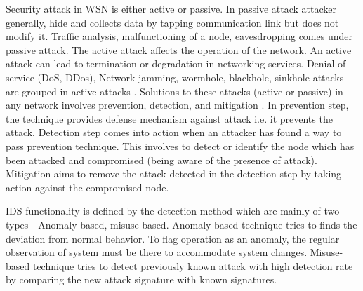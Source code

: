 Security attack in WSN is either active or passive. In passive attack attacker generally, hide and collects data by tapping communication link but does not modify it. Traffic analysis, malfunctioning of a node, eavesdropping comes under passive attack. The active attack affects the operation of the network. An active attack can lead to termination or degradation in networking services. Denial-of-service (DoS, DDos), Network jamming, wormhole, blackhole, sinkhole attacks are grouped in active attacks \cite{padmavathi2009survey}. Solutions to these attacks (active or passive) in any network involves prevention, detection, and mitigation \cite{fuchsberger2005intrusion}. In prevention step, the technique provides defense mechanism against attack i.e. it prevents the attack. Detection step comes into action when an attacker has found a way to pass prevention technique. This involves to detect or identify the node which has been attacked and compromised (being aware of the presence of attack). Mitigation aims to remove the attack detected in the detection step by taking action against the compromised node.
\par
IDS functionality is defined by the detection method which are mainly of two types - Anomaly-based, misuse-based. Anomaly-based technique tries to finds the deviation from normal behavior. To flag operation as an anomaly, the regular observation of system must be there to accommodate system changes. Misuse-based technique tries to detect previously known attack with high detection rate by comparing the new attack signature with known signatures.


